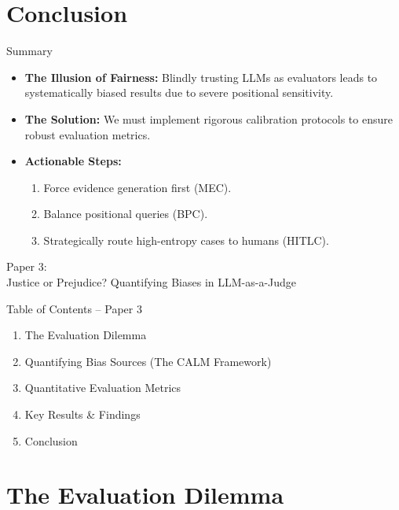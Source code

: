\documentclass[10pt]{beamer}
\begin{document}
\section{Conclusion}

\begin{frame}{Summary}
  \begin{itemize}
    \item \textbf{The Illusion of Fairness:} Blindly trusting LLMs as evaluators leads to systematically biased results due to severe positional sensitivity.
    \item \textbf{The Solution:} We must implement rigorous calibration protocols to ensure robust evaluation metrics.
    \item \textbf{Actionable Steps:} 
    \begin{enumerate}
        \item Force evidence generation first (MEC).
        \item Balance positional queries (BPC).
        \item Strategically route high-entropy cases to humans (HITLC).
    \end{enumerate}
  \end{itemize}
\end{frame}


\begin{frame}[standout]
  \hypertarget{paper3}{}
  \Large Paper 3:\\Justice or Prejudice? Quantifying Biases in LLM-as-a-Judge
\end{frame}

\begin{frame}{Table of Contents -- Paper 3}
  \begin{enumerate}
    \item The Evaluation Dilemma
    \item Quantifying Bias Sources (The CALM Framework)
    \item Quantitative Evaluation Metrics
    \item Key Results \& Findings
    \item Conclusion
  \end{enumerate}
\end{frame}

\section{The Evaluation Dilemma}
\end{document}
